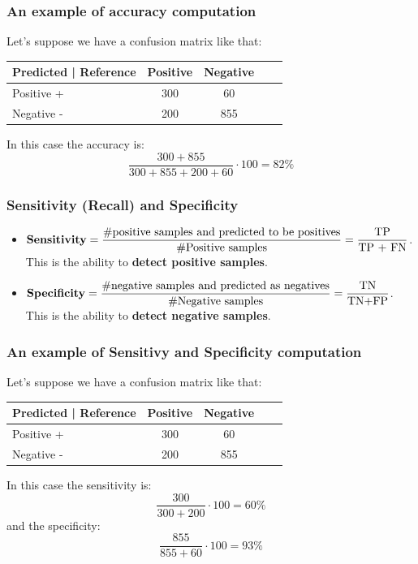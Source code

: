 \documentclass[9pt]{beamer}
\begin{document}
\begin{frame}
\frametitle{An example of accuracy computation}
Let's suppose we have a confusion matrix like that:
\begin{table}
\begin{tabular}{l | c | c | c | c }
Predicted | Reference & Positive & Negative \\
\hline \hline
Positive + & 300 & 60 \\ 
Negative - & 200 & 855 \\
\end{tabular}
\end{table}
In this case the accuracy is:
$$
\dfrac{300 + 855}{300 + 855 + 200 +60}\cdot 100 = 82 \% 
$$
\end{frame}

\begin{frame}
\frametitle{Sensitivity (Recall) and Specificity}
\begin{itemize}
\item $ \mbox{\textbf{Sensitivity}} = \dfrac{\# \mbox{positive samples and predicted to be positives}}{\# \mbox{Positive samples}} = \dfrac{\mbox{TP}}{\mbox{TP + FN}}$.\\
\vspace{2mm}
This is the ability to \textbf{detect positive samples}.
\item $\mbox{\textbf{Specificity}} = \dfrac{\# \mbox{negative samples and predicted as negatives}}{\# \mbox{Negative samples}} = \dfrac{\mbox{TN}}{\mbox{TN+FP}}$.\\
\vspace{2mm}
This is the ability to \textbf{detect negative samples}.
\end{itemize}
\end{frame}

\begin{frame}
\frametitle{An example of Sensitivy and Specificity computation}
Let's suppose we have a confusion matrix like that:
\begin{table}
\begin{tabular}{l | c | c | c | c }
Predicted | Reference & Positive & Negative \\
\hline \hline
Positive + & 300 & 60 \\ 
Negative - & 200 & 855 \\
\end{tabular}
\end{table}
In this case the sensitivity is:
$$
\dfrac{300}{300 + 200}\cdot 100 = 60 \% 
$$
and the specificity:
$$
\dfrac{855}{855 + 60}\cdot 100 = 93 \% 
$$
\end{frame}
\end{document}
